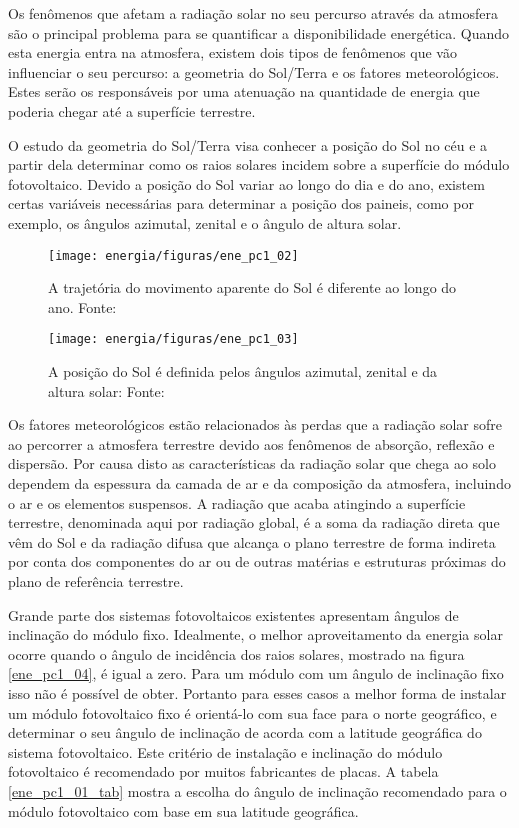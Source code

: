 	Os fenômenos que afetam a radiação solar no seu percurso através da atmosfera são o principal problema para se quantificar a disponibilidade energética. Quando esta energia entra na atmosfera, existem dois tipos de fenômenos que vão influenciar o seu percurso: a geometria do Sol/Terra e os fatores meteorológicos. Estes serão os responsáveis por uma atenuação na quantidade de energia que poderia chegar até a superfície terrestre. \cite{Sofia}
	
	O estudo da geometria do Sol/Terra visa conhecer a posição do Sol no céu e a partir dela determinar como os raios solares incidem sobre a superfície do módulo fotovoltaico. Devido a posição do Sol variar ao longo do dia e do ano, existem certas variáveis necessárias para determinar a posição dos paineis, como por exemplo, os ângulos azimutal, zenital e o ângulo de altura solar. \cite{Villalva}
	
\begin{figure}[H]
		\centering
		\texttt{[image: energia/figuras/ene\_pc1\_02]}
		\caption{A trajetória do movimento aparente do Sol é diferente ao longo do ano. Fonte: \cite{Villalva}}
		\label{ene_pc1_02}
	\end{figure}	
	
\begin{figure}[H]
		\centering
		\texttt{[image: energia/figuras/ene\_pc1\_03]}
		\caption{A posição do Sol é definida pelos ângulos azimutal, zenital e da altura solar: Fonte: \cite{Villalva}}
		\label{ene_pc1_03}
	\end{figure}	

Os fatores meteorológicos estão relacionados às perdas que a radiação solar sofre ao percorrer a atmosfera terrestre devido aos fenômenos de absorção, reflexão e dispersão. Por causa disto as características da radiação solar que chega ao solo dependem da espessura da camada de ar e da composição da atmosfera, incluindo o ar e os elementos suspensos. A radiação que acaba atingindo a superfície terrestre, denominada aqui por radiação global, é a soma da radiação direta que vêm do Sol e da radiação difusa que alcança o plano terrestre de forma indireta por conta dos componentes do ar ou de outras matérias e estruturas próximas do plano de referência terrestre. \cite{Villalva}

	Grande parte dos sistemas fotovoltaicos existentes apresentam ângulos de inclinação do módulo fixo. Idealmente, o melhor aproveitamento da energia solar ocorre quando o ângulo de incidência dos raios solares, mostrado na figura \ref{ene_pc1_04}, é igual a zero. Para um módulo com um ângulo de inclinação fixo isso não é possível de obter. Portanto para esses casos a melhor forma de instalar um módulo fotovoltaico fixo é orientá-lo com sua face para o norte geográfico, e determinar o seu ângulo de inclinação de acorda com a latitude geográfica do sistema fotovoltaico. Este critério de instalação e inclinação do módulo fotovoltaico é recomendado por muitos fabricantes de placas. A tabela \ref{ene_pc1_01_tab} mostra a escolha do ângulo de inclinação recomendado para o módulo fotovoltaico com base em sua latitude geográfica.
	
